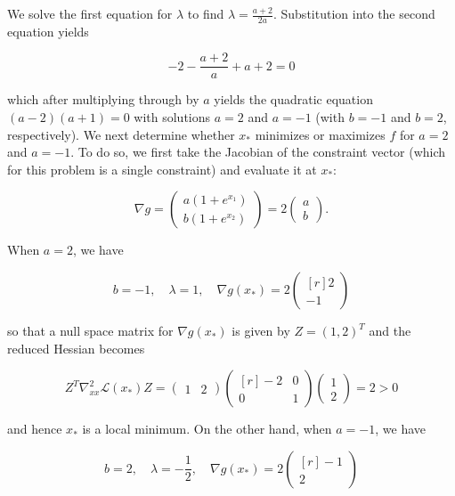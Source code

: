 \begin{solution}
    We solve the first equation for $\lambda$ to find $\lambda = \frac{a + 2}{2a}$. Substitution into the second 
    equation yields

    $$
    -2 - \frac{a + 2}{a} + a + 2 = 0
    $$

    which after multiplying through by $a$ yields the quadratic equation $(a - 2)(a + 1) = 0$ with solutions $a = 2$ and
    $a = -1$ (with $b = -1$ and $b = 2$, respectively). We next determine whether $x_*$ minimizes or maximizes $f$ for
    $a = 2$ and $a = -1$. To do so, we first take the Jacobian of the constraint vector (which for this problem is a
    single constraint) and evaluate it at $x_*$:

    $$
    \nabla g = \begin{pmatrix*}
        a \left(1 + e^{x_1} \right) \\
        b \left(1 + e^{x_2} \right)
    \end{pmatrix*} = 2 \begin{pmatrix*}
        a \\
        b
    \end{pmatrix*}.
    $$

    When $a = 2$, we have 
    
    $$
    b = -1, \quad \lambda = 1, \quad \nabla g(x_*) = 2 \begin{pmatrix*}[r]
        2 \\
       -1
    \end{pmatrix*}
    $$

    so that a null space matrix for $\nabla g(x_*)$ is given by $Z = (1, 2)^T$ and the reduced Hessian becomes

    $$
    Z^T \nabla^2_{xx} \mathcal{L}(x_*) Z = \begin{pmatrix*}
        1 & 2
    \end{pmatrix*} \begin{pmatrix*}[r]
        -2 & 0 \\
         0 & 1
    \end{pmatrix*} \begin{pmatrix*}
        1 \\
        2
    \end{pmatrix*} = 2 > 0
    $$

    and hence $x_*$ is a local minimum. On the other hand, when $a = -1$, we have

    $$
    b = 2, \quad \lambda = -\frac{1}{2}, \quad \nabla g(x_*) = 2 \begin{pmatrix*}[r]
       -1 \\
        2
    \end{pmatrix*}
    $$


\end{solution}
